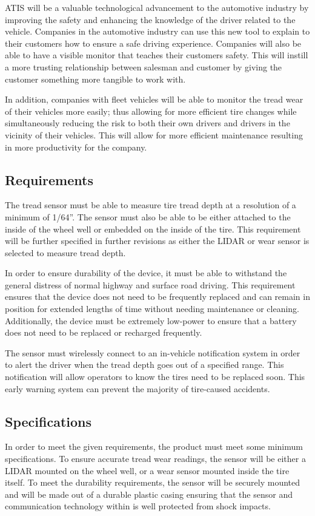\documentclass[11pt]{IEEEtran}
\begin{document}
			ATIS will be a valuable technological advancement to the automotive industry by improving the safety and enhancing the knowledge of the driver related to the vehicle. Companies in the automotive industry can use this new tool to explain to their customers how to ensure a safe driving experience. Companies will also be able to have a visible monitor that teaches their customers safety. This will instill a more trusting relationship between salesman and customer by giving the customer something more tangible to work with.

			In addition, companies with fleet vehicles will be able to monitor the tread wear of their vehicles more easily; thus allowing for more efficient tire changes while simultaneously reducing the risk to both their own drivers and drivers in the vicinity of their vehicles. This will allow for more efficient maintenance resulting in more productivity for the company. 

		\subsection{Requirements}
			The tread sensor must be able to measure tire tread depth at a resolution of a minimum of 1/64''. The sensor must also be able to be either attached to the inside of the wheel well or embedded on the inside of the tire. This requirement will be further specified in further revisions as either the LIDAR or wear sensor is selected to measure tread depth.

			In order to ensure durability of the device, it must be able to withstand the general distress of normal highway and surface road driving. This requirement ensures that the device does not need to be frequently replaced and can remain in position for extended lengths of time without needing maintenance or cleaning. Additionally, the device must be extremely low-power to ensure that a battery does not need to be replaced or recharged frequently.

			The sensor must wirelessly connect to an in-vehicle notification system in order to alert the driver when the tread depth goes out of a specified range. This notification will allow operators to know the tires need to be replaced soon. This early warning system can prevent the majority of tire-caused accidents.
 
		\subsection{Specifications}
			In order to meet the given requirements, the product must meet some minimum specifications. To ensure accurate tread wear readings, the sensor will be either a LIDAR mounted on the wheel well, or a wear sensor mounted inside the tire itself. To meet the durability requirements, the sensor will be securely mounted and will be made out of a durable plastic casing ensuring that the sensor and communication technology within is well protected from shock impacts.
\end{document}
